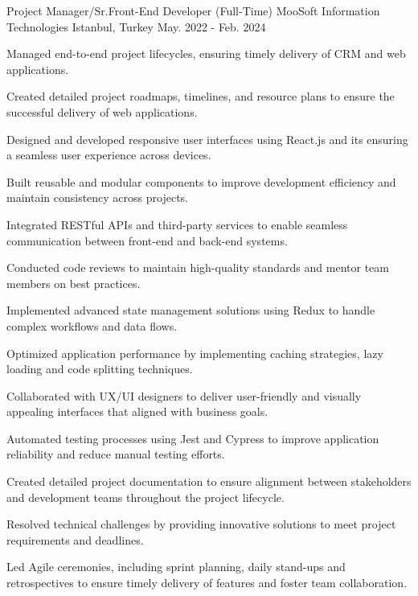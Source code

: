 \begin{cventries}
  \cvnewexperience
    {Project Manager/Sr.Front-End Developer (Full-Time)} %
    {MooSoft Information Technologies} %
    {Istanbul, Turkey} %
    {May. 2022 - Feb. 2024} %
    {
      \begin{cvitems} %
        \item {Managed end-to-end project lifecycles, ensuring timely delivery of CRM and web applications.}
        \item {Created detailed project roadmaps, timelines, and resource plans to ensure the successful delivery of web applications.}
        \item {Designed and developed responsive user interfaces using React.js and its ensuring a seamless user experience across devices.}
        \item {Built reusable and modular components to improve development efficiency and maintain consistency across projects.}
        \item {Integrated RESTful APIs and third-party services to enable seamless communication between front-end and back-end systems.}
        \item {Conducted code reviews to maintain high-quality standards and mentor team members on best practices.}
        \item {Implemented advanced state management solutions using Redux to handle complex workflows and data flows.}
        \item {Optimized application performance by implementing caching strategies, lazy loading and code splitting techniques.}
        \item {Collaborated with UX/UI designers to deliver user-friendly and visually appealing interfaces that aligned with business goals.}
        \item {Automated testing processes using Jest and Cypress to improve application reliability and reduce manual testing efforts.}
        \item {Created detailed project documentation to ensure alignment between stakeholders and development teams throughout the project lifecycle.}
        \item {Resolved technical challenges by providing innovative solutions to meet project requirements and deadlines.}
        \item {Led Agile ceremonies, including sprint planning, daily stand-ups and retrospectives to ensure timely delivery of features and foster team collaboration.}

\end{cvitems}}
\end{cventries}
